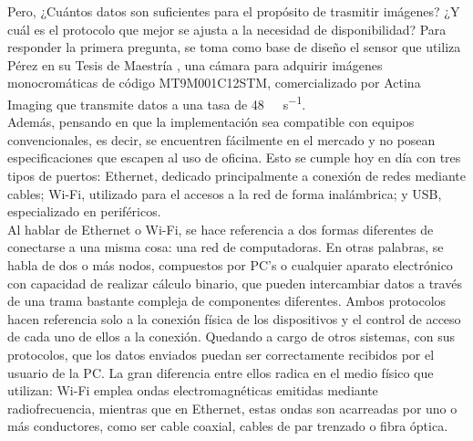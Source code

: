 


Pero, ¿Cuántos datos son suficientes para el propósito de trasmitir imágenes? ¿Y cuál es el protocolo que mejor se ajusta a la necesidad de disponibilidad? Para responder la primera pregunta, se toma como base de diseño el sensor que utiliza Pérez en su Tesis de Maestría \cite{Perez2018}, una cámara para adquirir imágenes monocromáticas de código MT9M001C12STM, comercializado por Actina Imaging \cite{MicronTechnology2004} que transmite datos a una tasa de \SI{48}{\mega\bit\per\second}.\\

Además, pensando en que la implementación sea compatible con equipos convencionales, es decir, se encuentren fácilmente en el mercado y no posean especificaciones que escapen al uso de oficina. Esto se cumple hoy en día con tres tipos de puertos: Ethernet, dedicado principalmente a conexión de redes mediante cables; Wi-Fi, utilizado para el accesos a la red de forma inalámbrica; y USB, especializado en periféricos.\\

Al hablar de Ethernet o Wi-Fi, se hace referencia a dos formas diferentes de conectarse a una misma cosa: una red de computadoras. En otras palabras, se habla de dos o más nodos, compuestos por PC's o cualquier aparato electrónico con capacidad de realizar cálculo binario, que pueden intercambiar datos a través de una trama bastante compleja de componentes diferentes. Ambos protocolos hacen referencia solo a la conexión física de los dispositivos y el control de acceso de cada uno de ellos a la conexión. Quedando a cargo de otros sistemas, con sus protocolos, que los datos enviados puedan ser correctamente recibidos por el usuario de la PC. La gran diferencia entre ellos radica en el medio físico que utilizan: Wi-Fi emplea ondas electromagnéticas emitidas mediante radiofrecuencia, mientras que en Ethernet, estas ondas son acarreadas por uno o más conductores, como ser cable coaxial, cables de par trenzado o fibra óptica.\\

